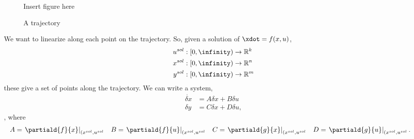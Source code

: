 \documentclass[10pt]{article}
\begin{document}
\begin{figure}
  \centering
  {\Large Insert figure here}
  \caption{A trajectory}
\end{figure}
We want to linearize along each point on the trajectory.
So, given a solution of $\xdot = f(x,u)$,
\begin{equation}
  \begin{split}
    u^{sol} &: [0,\infinity) \rightarrow \mathbb{R}^k\\
    x^{sol} &: [0,\infinity) \rightarrow \mathbb{R}^n\\
    y^{sol} &: [0,\infinity) \rightarrow \mathbb{R}^m\\
  \end{split}
\end{equation}
these give a set of points along the trajectory.  We can write a
system,
\begin{equation}
  \begin{split}
    \dot{\delta x} &= A \delta x + B \delta u\\
    \delta y &= C\delta x + D \delta u,
  \end{split}
\end{equation},
where
\begin{align}
  A &= \left.\partiald{f}{x}\right|_{(\sol{x},\sol{u}} & 
  B &= \left.\partiald{f}{u}\right|_{(\sol{x},\sol{u}} & 
  C &= \left.\partiald{g}{x}\right|_{(\sol{x},\sol{u}} & 
  D &= \left.\partiald{g}{u}\right|_{(\sol{x},\sol{u}}.
\end{align}
\end{document}
